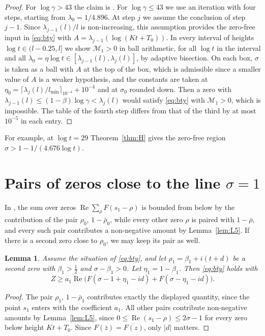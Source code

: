 \documentclass[11pt]{amsart}
\numberwithin{equation}{section}
\newtheorem{lemma}[theorem]{Lemma}
\theoremstyle{definition}
\theoremstyle{remark}
\newcommand{\Rp}{\operatorname{Re}}
\begin{document}
\begin{proof}
For $\log\gamma > 43$ the claim is \cite[Theorem~1]{BTY}.
For $\log\gamma \leq 43$ we use an iteration with four steps, starting from $\lambda_0 = 1/4.896$.
At step $j$ we assume the conclusion of step $j-1$.
Since $\lambda_{j-1}(l)/l$ is non-increasing, this assumption provides the zero-free input in \eqref{eq:bty} with $A = \lambda_{j-1}(\log(Kt + T_0))$.
In every interval of heights $\log t \in (l - 0.25, l]$ we show $\mathcal M_1 > 0$ in ball arithmetic, for all $\log t$ in the interval and all $\lambda_0 = \eta\log t \in [\lambda_{j-1}(l), \lambda_j(l)]$, by adaptive bisection.
On each box, $\sigma$ is taken as a ball with $A$ at the top of the box, which is admissible since a smaller value of $A$ is a weaker hypothesis, and the constants are taken at $\eta_0 = \lceil\lambda_j(l)/l_{\min}\rceil_{10^{-4}} + 10^{-4}$ and at $\sigma_0$ rounded down.
Then a zero with $\lambda_{j-1}(l) \leq (1 - \beta)\log\gamma < \lambda_j(l)$ would satisfy \eqref{eq:bty} with $\mathcal M_1 > 0$, which is impossible.
The table of the fourth step differs from that of the third by at most $10^{-5}$ in each entry.
\end{proof}

For example, at $\log t = 29$ Theorem~\ref{thm:H} gives the zero-free region $\sigma > 1 - 1/(4.676\log t)$.

\section{Pairs of zeros close to the line \texorpdfstring{$\sigma = 1$}{sigma = 1}}\label{sec:rep}

In \cite[Lemma~6]{BTY}, the sum over zeros $\Rp\sum_\rho F(s_1 - \rho)$ is bounded from below by the contribution of the pair $\rho_0$, $1 - \bar\rho_0$, while every other zero $\rho$ is paired with $1 - \bar\rho$, and every such pair contributes a non-negative amount by Lemma~\ref{lem:L5}.
If there is a second zero close to $\rho_0$, we may keep its pair as well.

\begin{lemma}\label{lem:twozero}
Assume the situation of \eqref{eq:bty}, and let $\rho_1 = \beta_1 + i(t + d)$ be a second zero with $\beta_1 > \frac12$ and $\sigma - \beta_1 > 0$.
Let $\eta_1 = 1 - \beta_1$.
Then \eqref{eq:bty} holds with
\[
Z \geq a_1\Rp\big(F(\sigma - 1 + \eta_1 - id) + F(\sigma - \eta_1 - id)\big).
\]
\end{lemma}

\begin{proof}
The pair $\rho_1$, $1 - \bar\rho_1$ contributes exactly the displayed quantity, since the point $s_1$ enters with the coefficient $a_1$.
All other pairs contribute non-negative amounts by Lemma~\ref{lem:L5}, since $0 \leq \Rp(s_1 - \rho) \leq 2\sigma - 1$ for every zero below height $Kt + T_0$.
Since $F(\bar z) = \overline{F(z)}$, only $|d|$ matters.
\end{proof}
\end{document}
